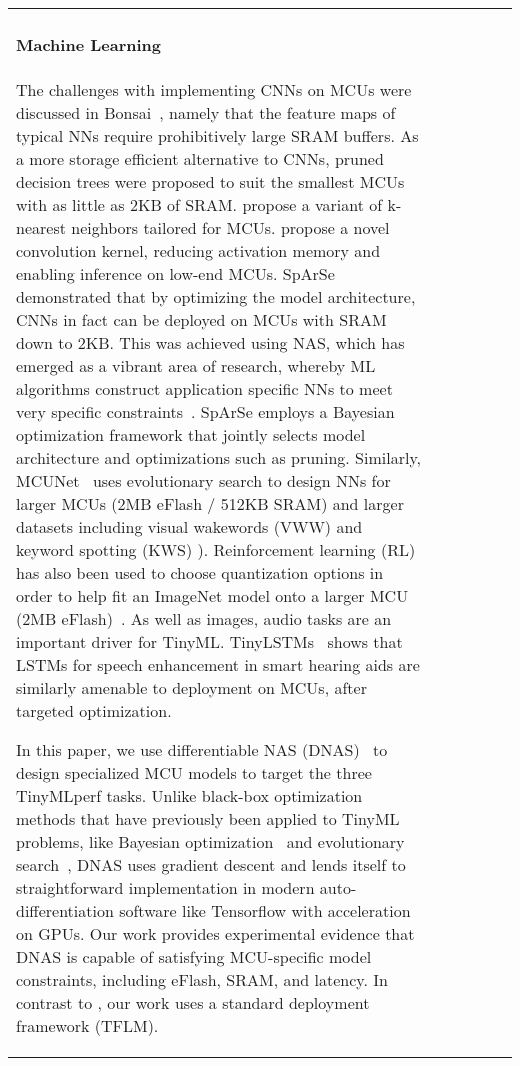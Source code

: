 \documentclass{article}
\begin{document}
\begin{table}[t]
\begin{tabular}{l| c | c | c | c | c}
\paragraph{Machine Learning}
The challenges with implementing CNNs on MCUs were discussed in Bonsai~\cite{kumar2017bonsai}, namely that the feature maps of typical NNs require prohibitively large SRAM buffers. As a more storage efficient alternative to CNNs, pruned decision trees were proposed to suit the smallest MCUs with as little as 2KB of SRAM. \citet{gupta2017protonn} propose a variant of k-nearest neighbors tailored for MCUs. \citet{pmlr-v97-gural19a} propose a novel convolution kernel, reducing activation memory and enabling inference on low-end MCUs. SpArSe~\cite{fedorov2019sparse} demonstrated that by optimizing the model architecture, CNNs in fact can be deployed on MCUs with SRAM down to 2KB.
This was achieved using NAS, which has emerged as a vibrant area of research, whereby ML algorithms construct application specific NNs to meet very specific constraints~\cite{elsken_neural2019}. 
SpArSe employs a Bayesian optimization framework that jointly selects model architecture and optimizations such as pruning. 
Similarly, MCUNet~\cite{lin2020mcunet} uses evolutionary search to design NNs for larger MCUs (2MB eFlash / 512KB SRAM) and larger datasets including visual wakewords (VWW) \cite{chowdhery2019visual} and keyword spotting (KWS) \cite{warden2018speech}). 
Reinforcement learning (RL) has also been used to choose quantization options in order to help fit an ImageNet model onto a larger MCU (2MB eFlash)~\cite{rusci2020leveraging}.
As well as images, audio tasks are an important driver for TinyML. TinyLSTMs~\cite{fedorov2020tinylstms} shows that LSTMs for speech enhancement in smart hearing aids are similarly amenable to deployment on MCUs, after targeted optimization.



In this paper, we use differentiable NAS (DNAS)~\cite{liu2018darts} to design specialized MCU models to target the three TinyMLperf tasks.
Unlike black-box optimization methods that have previously been applied to TinyML problems, like Bayesian optimization~\cite{fedorov2019sparse} and evolutionary search~\cite{lin2020mcunet}, DNAS uses gradient descent and lends itself to straightforward implementation in modern auto-differentiation software like Tensorflow with acceleration on GPUs. 
Our work provides experimental evidence that DNAS is capable of satisfying MCU-specific model constraints, including eFlash, SRAM, and latency. In contrast to \cite{lin2020mcunet}, our work uses a standard deployment framework (TFLM). 



\end{tabular}
\end{table}
\end{document}
